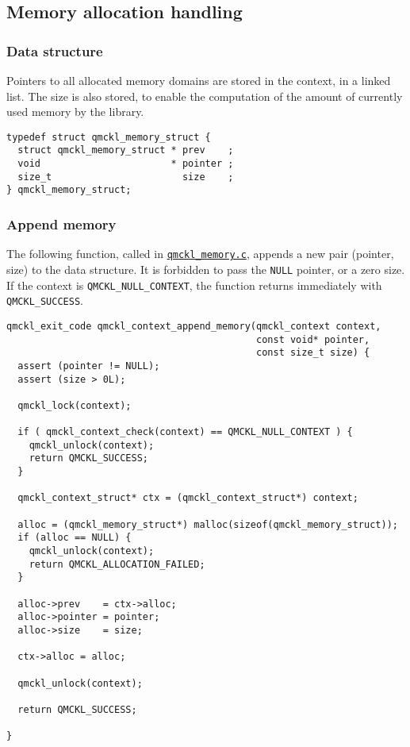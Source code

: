 \subsection{Memory allocation handling}
\label{sec:orgefbc5fb}

\subsubsection{Data structure}
\label{sec:orgdddff50}

Pointers to all allocated memory domains are stored in the context,
in a linked list. The size is also stored, to enable the
computation of the amount of currently used memory by the library.

\begin{verbatim}
typedef struct qmckl_memory_struct {
  struct qmckl_memory_struct * prev    ;
  void                       * pointer ;
  size_t                       size    ;
} qmckl_memory_struct;
\end{verbatim}

\subsubsection{Append memory}
\label{sec:orgbdc2712}

The following function, called in \href{./qmckl\_memory.html}{\texttt{qmckl\_memory.c}}, appends a new
pair (pointer, size) to the data structure.
It is forbidden to pass the \texttt{NULL} pointer, or a zero size.
If the context is \texttt{QMCKL\_NULL\_CONTEXT}, the function returns
immediately with \texttt{QMCKL\_SUCCESS}.

\begin{verbatim}
qmckl_exit_code qmckl_context_append_memory(qmckl_context context,
                                            const void* pointer,
                                            const size_t size) {
  assert (pointer != NULL);
  assert (size > 0L);

  qmckl_lock(context);

  if ( qmckl_context_check(context) == QMCKL_NULL_CONTEXT ) {
    qmckl_unlock(context);
    return QMCKL_SUCCESS;
  }

  qmckl_context_struct* ctx = (qmckl_context_struct*) context; 

  alloc = (qmckl_memory_struct*) malloc(sizeof(qmckl_memory_struct));
  if (alloc == NULL) {
    qmckl_unlock(context);
    return QMCKL_ALLOCATION_FAILED;
  }
  
  alloc->prev    = ctx->alloc;
  alloc->pointer = pointer;
  alloc->size    = size;

  ctx->alloc = alloc;
    
  qmckl_unlock(context);

  return QMCKL_SUCCESS;

}
\end{verbatim}

